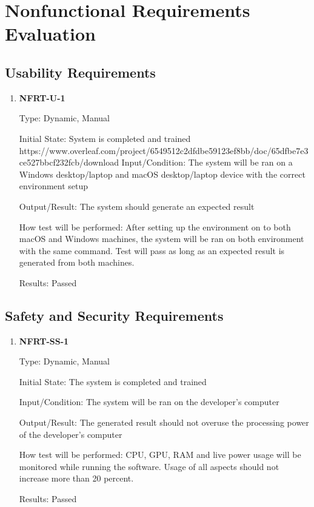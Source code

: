 \documentclass[12pt, titlepage]{article}
\begin{document}
\section{Nonfunctional Requirements Evaluation}

\subsection{Usability Requirements}

\begin{enumerate}

\item \textbf{NFRT-U-1}
    
Type: Dynamic, Manual
    					
Initial State: System is completed and trained
    					https://www.overleaf.com/project/6549512c2dfdbe59123ef8bb/doc/65dfbe7e3ce527bbcf232fcb/download
Input/Condition: The system will be ran on a Windows desktop/laptop and macOS desktop/laptop device with the correct environment setup
    					
Output/Result: The system should generate an expected result 
    					
How test will be performed: After setting up the environment on to both macOS and Windows machines, the system will be ran on both environment with the same command. Test will pass as long as an expected result is generated from both machines.

Results: Passed
    
\end{enumerate}
		
\subsection{Safety and Security Requirements}

\begin{enumerate}

\item \textbf{NFRT-SS-1}

Type: Dynamic, Manual
					
Initial State: The system is completed and trained 
					
Input/Condition: The system will be ran on the developer's computer
					
Output/Result: The generated result should not overuse the processing power of the developer's computer
					
How test will be performed: CPU, GPU, RAM and live power usage will be monitored while running the software. Usage of all aspects should not increase more than 20 percent.   

Results: Passed
					
\end{enumerate}
\end{document}
